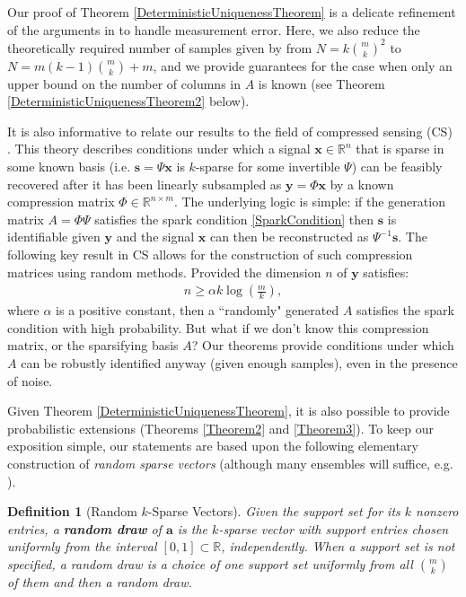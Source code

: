 \documentclass[journal, onecolumn]{IEEEtran}
\newtheorem{definition}{Definition}
\begin{document}
Our proof of Theorem \ref{DeterministicUniquenessTheorem} is a delicate refinement of the arguments in \cite{Hillar15} to handle measurement error.  Here, we also reduce the theoretically required number of samples given by \cite{Hillar15} from $N=k{m \choose k}^2$ to $N = m(k-1){m \choose k}+m$, and we provide guarantees for the case when only an upper bound on the number of columns in $A$ is known (see Theorem \ref{DeterministicUniquenessTheorem2} below). 

It is also informative to relate our results to the field of compressed sensing (CS) \cite{candes2006near, donoho2006compressed, candes2006stable}. This theory describes conditions under which a signal $\mathbf{x} \in \mathbb{R}^n$ that is sparse in some known basis (i.e. $\mathbf{s} = \Psi \mathbf{x}$ is $k$-sparse for some invertible $\Psi$) can be feasibly recovered after it has been linearly subsampled as $\mathbf{y} = \Phi \mathbf{x}$ by a known compression matrix $\Phi \in \mathbb{R}^{n \times m}$. The underlying logic is simple: if the generation matrix $A = \Phi\Psi$ satisfies the spark condition \eqref{SparkCondition} then $\mathbf{s}$ is identifiable given $\mathbf{y}$ and the signal $\mathbf{x}$ can then be reconstructed as $\Psi^{-1}\mathbf{s}$. The following key result in CS allows for the construction of such compression matrices using random methods. Provided the dimension $n$ of $\mathbf{y}$ satisfies:
\begin{align}\label{CScondition}
n \geq \alpha k\log\left(\frac{m}{k}\right),
\end{align}
where $\alpha$ is a positive constant, then a ``randomly" generated $A$ satisfies the spark condition with high probability.  But what if we don't know this compression matrix, or the sparsifying basis $A$? Our theorems provide conditions under which $A$ can be robustly identified anyway (given enough samples), even in the presence of noise. 

Given Theorem \ref{DeterministicUniquenessTheorem}, it is also possible to provide probabilistic extensions (Theorems \ref{Theorem2} and \ref{Theorem3}).  To keep our exposition simple, our statements are based upon the following elementary construction of \emph{random sparse vectors} (although many ensembles will suffice, e.g. \cite[Sec.~\S 4]{baraniuk2008simple}).

\begin{definition}[Random $k$-Sparse Vectors]\label{RandomDraw}
Given the support set for its $k$ nonzero entries, a \textbf{random draw} of $\mathbf{a}$ is the $k$-sparse vector with support entries chosen uniformly from the interval $[0, 1] \subset \mathbb{R}$, independently. When a support set is not specified, a random draw is a choice of one support set uniformly from all ${m \choose k}$ of them and then a random draw.
\end{definition}
\end{document}
